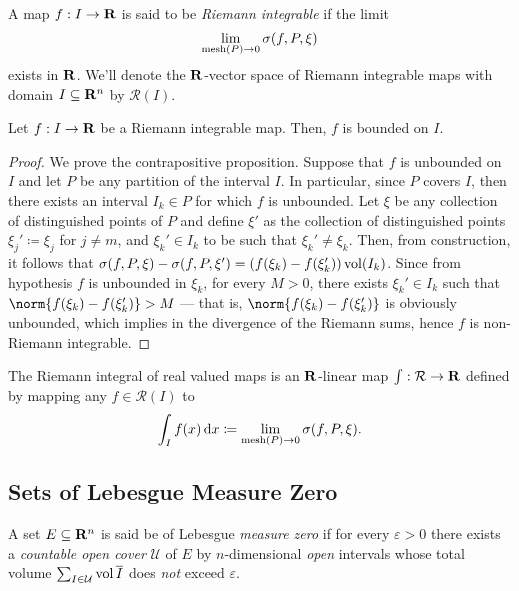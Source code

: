 \begin{definition}
\label{def:riemann-integrable}
A map \(f: I \to \mathbf{R}\) is said to be \emph{Riemann integrable} if the limit
\[
  \lim_{\operatorname{mesh}(P) \to 0} \sigma(f, P, \xi)
\]
exists in \(\mathbf{R}\). We'll denote the \(\mathbf{R}\)-vector space of Riemann integrable
maps with domain \(I \subseteq \mathbf{R}^n\) by \(\mathcal R(I)\).
\end{definition}

\begin{proposition}
\label{prop:riemann-integral-map-bounded}
Let \(f: I \to \mathbf{R}\) be a Riemann integrable map. Then, \(f\) is bounded on \(I\).
\end{proposition}

\begin{proof}
We prove the contrapositive proposition. Suppose that \(f\) is unbounded on
\(I\) and let \(P\) be any partition of the interval \(I\). In particular, since
\(P\) covers \(I\), then there exists an interval \(I_{k} \in P\) for which
\(f\) is unbounded. Let \(\xi\) be any collection of distinguished points of
\(P\) and define \(\xi'\) as the collection of distinguished points \(\xi_j'
\coloneq \xi_j\) for \(j \neq m\), and \(\xi_k' \in I_k\) to be such that
\(\xi_k' \neq \xi_k\). Then, from construction, it follows that \(\sigma(f, P,
\xi) - \sigma(f, P, \xi') = (f(\xi_k) - f(\xi_k')) \operatorname{vol}(I_k)\). Since from
hypothesis \(f\) is unbounded in \(\xi_k\), for every \(M > 0\), there exists
\(\xi_k' \in I_k\) such that \(\norm{f(\xi_k) - f(\xi_k')} > M\) --- that is,
\(\norm{f(\xi_k) - f(\xi_k')}\) is obviously unbounded, which implies in the
divergence of the Riemann sums, hence \(f\) is non-Riemann integrable.
\end{proof}

\begin{definition}
\label{def:riemann-integral}
The Riemann integral of real valued maps is an \(\mathbf{R}\)-linear map \(\int:
\mathcal R \to \mathbf{R}\) defined by mapping any \(f \in \mathcal R(I)\) to
\[
  \int_I f(x)\, \mathrm{d} x \coloneqq \lim_{\operatorname{mesh}(P) \to 0} \sigma(f, P, \xi).
\]
\end{definition}

\subsection{Sets of Lebesgue Measure Zero}

\begin{definition}
\label{def:measure-zero-set}
A set \(E \subseteq \mathbf{R}^n\) is said be of Lebesgue \emph{measure zero} if for
every \(\varepsilon > 0\) there exists a \emph{countable open cover} \(\mathcal
U\) of \(E\) by \(n\)-dimensional \emph{open} intervals whose total volume
\(\sum_{I \in \mathcal U} \operatorname{vol} \overline{I}\) does \emph{not} exceed
\(\varepsilon\).
\end{definition}

